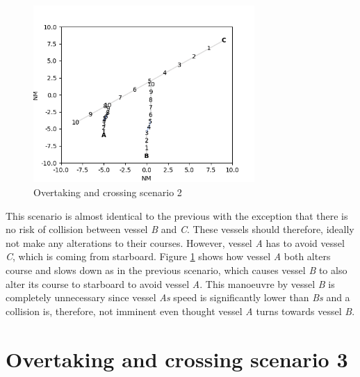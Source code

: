 \begin{figure}[H]
    \centering
    \includegraphics[width=0.75\textwidth,height=0.75\textheight,keepaspectratio]{../src/img/overtaking_crossing_3_res.png}
    \caption{Overtaking and crossing scenario 2}
    \label{fig:overtaking-and-crossing-3-res}
\end{figure}

This scenario is almost identical to the previous with the exception that there is no risk of collision between vessel \textit{B} and \textit{C}. These vessels should therefore, ideally not make any alterations to their courses. However, vessel \textit{A} has to avoid vessel \textit{C}, which is coming from starboard. Figure \ref{fig:overtaking-and-crossing-3-res} shows how vessel \textit{A} both alters course and slows down as in the previous scenario, which causes vessel \textit{B} to also alter its course to starboard to avoid vessel \textit{A}. This manoeuvre by vessel \textit{B} is completely unnecessary since vessel \textit{As} speed is significantly lower than \textit{Bs} and a collision is, therefore, not imminent even thought vessel \textit{A} turns towards vessel \textit{B}.

\section{Overtaking and crossing scenario 3}%


